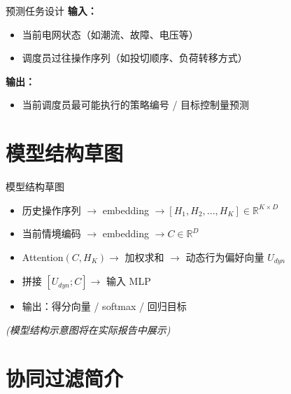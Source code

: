 \documentclass[11pt]{beamer}
\begin{document}
\begin{frame}{预测任务设计}
 \textbf{输入：}
 \begin{itemize}
  \item 当前电网状态（如潮流、故障、电压等）
  \item 调度员过往操作序列（如投切顺序、负荷转移方式）
 \end{itemize}
 \bigskip
 \textbf{输出：}
 \begin{itemize}
  \item 当前调度员最可能执行的策略编号 / 目标控制量预测
 \end{itemize}
\end{frame}

\section{模型结构草图}

\begin{frame}{模型结构草图}
 \centering
 \begin{itemize}
  \item 历史操作序列 $\rightarrow$ embedding $\rightarrow [H_1, H_2, ..., H_K] \in \mathbb{R}^{K \times D}$
  \item 当前情境编码 $\rightarrow$ embedding $\rightarrow C \in \mathbb{R}^{D}$
  \item Attention$(C, H_K) \rightarrow$ 加权求和 $\rightarrow$ 动态行为偏好向量 $U_{dyn}$
  \item 拼接 $[U_{dyn} ; C] \rightarrow$ 输入 MLP
  \item 输出：得分向量 / softmax / 回归目标
 \end{itemize}
 \textit{(模型结构示意图将在实际报告中展示)}
\end{frame}


\section{协同过滤简介}
\end{document}
